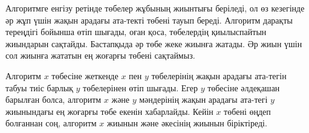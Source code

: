 
Алгоритмге енгізу ретінде төбелер жұбының жиынтығы
беріледі, ол өз кезегінде әр жұп үшін жақын арадағы ата-текті төбені тауып береді. Алгоритм дарақты тереңдігі бойынша өтіп шығады, оған қоса, төбелердің
қиылыспайтын жиындарын сақтайды.
Бастапқыда әр төбе жеке жиынға жатады.
Әр жиын үшін сол жиынға жататын ең жоғарғы төбені
сақтаймыз.

Алгоритм $x$ төбесіне жеткенде
$x$ пен $y$ төбелерінің жақын арадағы ата-тегін табуы тиіс барлық 
$y$ төбелерінен өтіп шығады.
Егер $y$ төбесіне әлдеқашан барылған болса, алгоритм
$x$ және $y$ мәндерінің жақын арадағы ата-тегі
$y$ жиынындағы ең жоғарғы төбе екенін хабарлайды.
Кейін $x$ төбені өңдеп болғаннан соң, алгоритм
$x$ жиынын және әкесінің жиынын біріктіреді.

